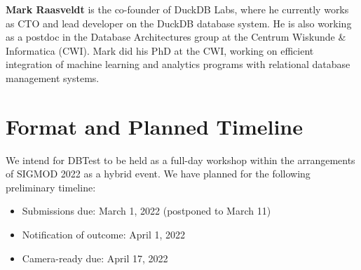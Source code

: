 \documentclass[sigconf]{acmart}
\begin{document}
\textbf{Mark Raasveldt} is the co-founder of DuckDB Labs, where he currently works as CTO and lead developer on the DuckDB database system. He is also working as a postdoc in the Database Architectures group at the Centrum Wiskunde \& Informatica (CWI). Mark did his PhD at the CWI, working on efficient integration of machine learning and analytics programs with relational database management systems. 

\section{Format and Planned Timeline}

We intend for DBTest to be held as a full-day workshop within the arrangements of SIGMOD 2022 as a hybrid event.
We have planned for the following preliminary timeline:
\begin{itemize}
    \item Submissions due: March 1, 2022 (postponed to March 11)
    \item Notification of outcome: April 1, 2022
    \item Camera-ready due: April 17, 2022
\end{itemize}
\end{document}
